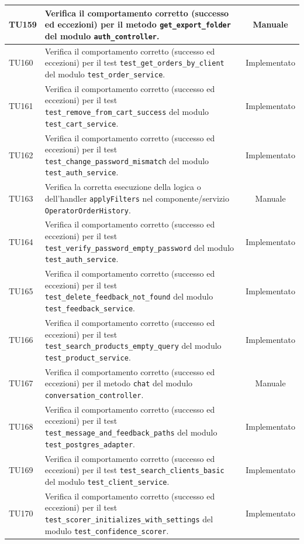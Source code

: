 \documentclass[a4paper,11pt,oneside]{scrartcl}
\begin{document}
\begin{longtable}{|p{1.9cm}|p{11.6cm}|c|}
    TU159 & Verifica il comportamento corretto (successo ed eccezioni) per il metodo \texttt{get\_export\_folder} del modulo \texttt{auth\_controller}. & Manuale \\ \hline
    TU160 & Verifica il comportamento corretto (successo ed eccezioni) per il test \texttt{test\_get\_orders\_by\_client} del modulo \texttt{test\_order\_service}. & Implementato \\ \hline
    TU161 & Verifica il comportamento corretto (successo ed eccezioni) per il test \texttt{test\_remove\_from\_cart\_success} del modulo \texttt{test\_cart\_service}. & Implementato \\ \hline
    TU162 & Verifica il comportamento corretto (successo ed eccezioni) per il test \texttt{test\_change\_password\_mismatch} del modulo \texttt{test\_auth\_service}. & Implementato \\ \hline
    TU163 & Verifica la corretta esecuzione della logica o dell'handler \texttt{applyFilters} nel componente/servizio \texttt{OperatorOrderHistory}. & Manuale \\ \hline
    TU164 & Verifica il comportamento corretto (successo ed eccezioni) per il test \texttt{test\_verify\_password\_empty\_password} del modulo \texttt{test\_auth\_service}. & Implementato \\ \hline
    TU165 & Verifica il comportamento corretto (successo ed eccezioni) per il test \texttt{test\_delete\_feedback\_not\_found} del modulo \texttt{test\_feedback\_service}. & Implementato \\ \hline
    TU166 & Verifica il comportamento corretto (successo ed eccezioni) per il test \texttt{test\_search\_products\_empty\_query} del modulo \texttt{test\_product\_service}. & Implementato \\ \hline
    TU167 & Verifica il comportamento corretto (successo ed eccezioni) per il metodo \texttt{chat} del modulo \texttt{conversation\_controller}. & Manuale \\ \hline
    TU168 & Verifica il comportamento corretto (successo ed eccezioni) per il test \texttt{test\_message\_and\_feedback\_paths} del modulo \texttt{test\_postgres\_adapter}. & Implementato \\ \hline
    TU169 & Verifica il comportamento corretto (successo ed eccezioni) per il test \texttt{test\_search\_clients\_basic} del modulo \texttt{test\_client\_service}. & Implementato \\ \hline
    TU170 & Verifica il comportamento corretto (successo ed eccezioni) per il test \texttt{test\_scorer\_initializes\_with\_settings} del modulo \texttt{test\_confidence\_scorer}. & Implementato \\ \hline

\end{longtable}
\end{document}
